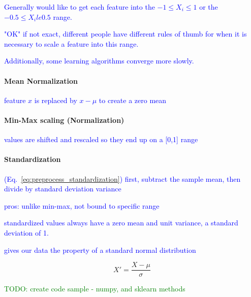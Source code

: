 \textcolor{blue}{Generally would like to get each feature into the $-1 \le X_i \le 1$ or the $-0.5 \le X_i le 0.5$ range.}

\textcolor{blue}{"OK" if not exact, different people have different rules of thumb for when it is necessary to scale a feature into this range.}

\textcolor{blue}{Additionally, some learning algorithms converge more slowly.}





\paragraph{Mean Normalization}

\textcolor{blue}{feature $x$ is replaced by $x - \mu$ to create a zero mean}


\paragraph{Min-Max scaling (Normalization)}

\textcolor{blue}{values are shifted and rescaled so they end up on a [0,1] range}

\paragraph{Standardization}

\textcolor{blue}{(Eq.~\ref{eq:preprocess_standardization}) first, subtract the sample mean, then divide by standard deviation variance}

\textcolor{blue}{pros: unlike min-max, not bound to specific range}

\textcolor{blue}{standardized values always have a zero mean and unit variance, a standard deviation of 1.}

\textcolor{blue}{gives our data the property of a standard normal distribution}

\begin{equation}
{X' = \frac{X - \mu}{\sigma}}
\label{eq:preprocess_standardization}
\end{equation}

\textcolor{green}{TODO: create code sample - numpy, and sklearn methods}

